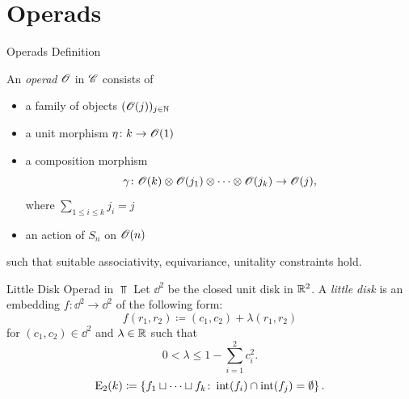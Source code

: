 \section{Operads}

\begin{frame}{}
    \tableofcontents[currentsection]
\end{frame}

\begin{frame}{Operads Definition}
      \begin{defin}
        An {\em operad} $\mathscr{O}$ in $\mathscr{C}$
        consists of 
        \begin{itemize}
        \item a family of objects $(\mathscr{O}(j))_{j \in \mathbb{N}}$
        \item a unit morphism $\eta \colon k \rightarrow \mathscr{O}(1)$
        \item a composition morphism
        \[
            \gamma \colon \mathscr{O}(k) \otimes \mathscr{O}(j_1) \otimes \cdots \otimes \mathscr{O}(j_k) \rightarrow \mathscr{O}(j),
        \]
        where $\sum_{1 \leq i \leq k} j_i = j$ 
        \item an action of $S_n$ on $\mathscr{O}(n)$ 
        \end{itemize}
        such that suitable
        associativity, equivariance, unitality constraints hold.
      \end{defin}
\end{frame}

\begin{frame}{Little Disk Operad in $\Top$}
  Let $\dd^2$ be the closed unit disk in $\mathbb{R}^2$. 
  A \emph{little disk} is
  an embedding $f \colon \dd^2 \to \dd^2$ of the following form:
  \[
    f(r_1, r_2) \coloneqq (c_1, c_2) 
  + \lambda(r_1, r_2)
  \]
  for $(c_1, c_2) \in \dd^2$ and $\lambda \in \mathbb{R}$ such that
  \[
      0 < \lambda \leq 1 - \sum_{i=1}^{2} c_i^2.     
  \]
  \[
      \operatorname{E}_2(k) \coloneqq \left\{ f_1 \sqcup \dots \sqcup f_k  \colon \operatorname{int}(f_i) \cap \operatorname{int}(f_j) = \emptyset \right\}.
  \]
\end{frame}


